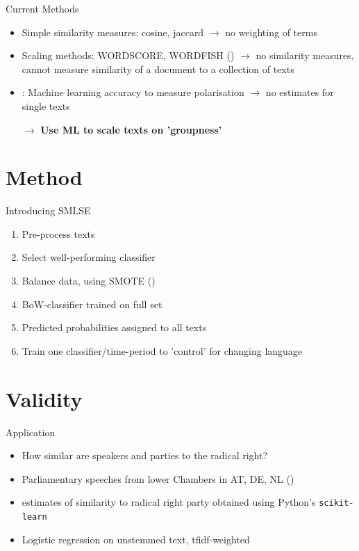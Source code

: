 \documentclass{beamer}
\begin{document}
\begin{frame}{Current Methods}
    \begin{itemize}
        \item Simple similarity measures: cosine, jaccard \newline
        $\rightarrow$ no weighting of terms
        \item Scaling methods: WORDSCORE, WORDFISH (\cite{Laver2003, Slapin2008}) \newline
        $\rightarrow$ no similarity measures, cannot measure similarity of a document to a collection of texts
        \item \cite{Peterson2018}: Machine learning accuracy to measure polarisation
        $\rightarrow$ no estimates for single texts
        \item[$\rightarrow$]\textbf{Use ML to scale texts on 'groupness'}
    \end{itemize}
\end{frame}

\section{Method}

\begin{frame}{Introducing SMLSE}
    \begin{enumerate}
        \item Pre-process texts
        \item Select well-performing classifier
        \item Balance data, using SMOTE (\cite{Chawla2002})
        \item BoW-classifier trained on full set
        \item Predicted probabilities assigned to all texts
        \item Train one classifier/time-period to 'control' for changing language
    \end{enumerate}
\end{frame}


\section{Validity}
\begin{frame}{Application}
\begin{itemize}
    \item How similar are speakers and parties to the radical right?
    \item Parliamentary speeches from lower Chambers in AT, DE, NL (\cite{Rauh2020})
    \item estimates of similarity to radical right party obtained using Python's \texttt{scikit-learn}
    \item Logistic regression on unstemmed text, tfidf-weighted
\end{itemize}
\end{frame}
\end{document}
